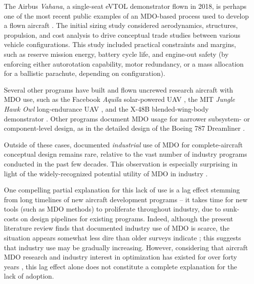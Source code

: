 \documentclass[12pt,vi,oneside,table]{report}
\begin{document}
    The Airbus \textit{Vahana}, a single-seat eVTOL demonstrator flown in 2018, is perhaps one of the most recent public examples of an MDO-based process used to develop a flown aircraft \cite{vahana_1, vahana_2, vahana_code}. The initial sizing study considered aerodynamics, structures, propulsion, and cost analysis to drive conceptual trade studies between various vehicle configurations. This study included practical constraints and margins, such as reserve mission energy, battery cycle life, and engine-out safety (by enforcing either autorotation capability, motor redundancy, or a mass allocation for a ballistic parachute, depending on configuration).

    Several other programs have built and flown uncrewed research aircraft with MDO use, such as the Facebook \textit{Aquila} solar-powered UAV \cite{fbhale}, the MIT \textit{Jungle Hawk Owl} long-endurance UAV \cite{jho}, and the X-48B blended-wing-body demonstrator \cite{wakayama_2000_blended, liebeck_blendedwingbody_1998, liebeck2004design}. Other programs document MDO usage for narrower subsystem- or component-level design, as in the detailed design of the Boeing 787 Dreamliner \cite{agte_mdo_2010}.

    Outside of these cases, documented \textit{industrial} use of MDO for complete-aircraft conceptual design remains rare, relative to the vast number of industry programs conducted in the past few decades. This observation is especially surprising in light of the widely-recognized potential utility of MDO in industry \cite{mcmasters_airplane_2002, torenbeek_advanced_2013}.

    One compelling partial explanation for this lack of use is a lag effect stemming from long timelines of new aircraft development programs -- it takes time for new tools (such as MDO methods) to proliferate throughout industry, due to sunk-costs on design pipelines for existing programs. Indeed, although the present literature review finds that documented industry use of MDO is scarce, the situation appears somewhat less dire than older surveys indicate \cite{kroo_multidisciplinary_1997, agte_mdo_2010, ashley_making_1982, haftka_multidisciplinary_1997, gazaix_industrialization_2017}; this suggests that industry use may be gradually increasing. However, considering that aircraft MDO research and industry interest in optimization has existed for over forty years \cite{vanderplaats_automated_1976, ashley_making_1982}, this lag effect alone does not constitute a complete explanation for the lack of adoption.
\end{document}
